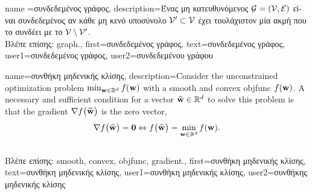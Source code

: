 {name ={\foreignlanguage{greek}{συνδεδεμένος γράφος}}, 
	description={\foreignlanguage{greek}{Ένας μη κατευθυνόμενος} 
		 $\mathcal{G}=\left( \mathcal{V},\mathcal{E} \right)$ \foreignlanguage{greek}{είναι συνδεδεμένος αν κάθε μη κενό υποσύνολο  
		$\mathcal{V}' \subset \mathcal{V}$ έχει τουλάχιστον μία ακμή που το συνδέει με το} $\mathcal{V} \setminus \mathcal{V}'$.\\
		\foreignlanguage{greek}{Βλέπε επίσης:} \gls{graph}.}, 
		first={\foreignlanguage{greek}{συνδεδεμένος γράφος}},
		text={\foreignlanguage{greek}{συνδεδεμένος γράφος}},
		user1={\foreignlanguage{greek}{συνδεδεμένος γράφος}}, %
		user2={\foreignlanguage{greek}{συνδεδεμένου γράφου}} %
}

{name={\foreignlanguage{greek}{συνθήκη μηδενικής κλίσης}},
	description={Consider the unconstrained 
		optimization problem $\min_{{\bf w} \in \mathbb{R}^{d}} f({\bf w})$  with 
			a \gls{smooth} and \gls{convex} \gls{objfunc} $f({\bf w})$. A necessary and 
			sufficient condition for a vector $\widehat{{\bf w}} \in \mathbb{R}^{d}$ 
			to solve this problem is that the \gls{gradient} $\nabla f \big( \widehat{{\bf w}} \big)$ 
			is the zero vector, 
			$$ \nabla f \big( \widehat{{\bf w}} \big) = \mathbf{0} \Leftrightarrow  f \big( \widehat{{\bf w}} \big) = \min_{{\bf w} \in \mathbb{R}^{d}} f({\bf w}) .$$\\
			\foreignlanguage{greek}{Βλέπε επίσης:} \gls{smooth}, \gls{convex}, \gls{objfunc}, \gls{gradient}.}, 
			first={\foreignlanguage{greek}{συνθήκη μηδενικής κλίσης}},
			text={\foreignlanguage{greek}{συνθήκη μηδενικής κλίσης}},
			user1={\foreignlanguage{greek}{συνθήκη μηδενικής κλίσης}}, %
			user2={\foreignlanguage{greek}{συνθήκης μηδενικής κλίσης}} %
}

